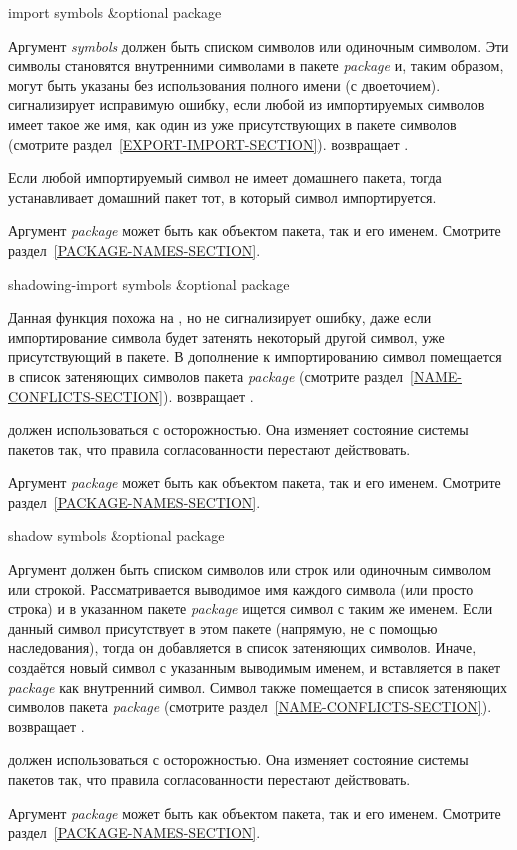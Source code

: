 \begin{defun}[Функция]
import symbols &optional package

Аргумент \emph{symbols} должен быть списком символов или одиночным символом.
Эти символы становятся внутренними символами в пакете \emph{package} и, таким
образом, могут быть указаны без использования полного имени (с двоеточием).
 сигнализирует исправимую ошибку, если любой из импортируемых
символов имеет такое же имя, как один из уже присутствующих в пакете символов
(смотрите раздел~\ref{EXPORT-IMPORT-SECTION}).
 возвращает {\true}.

Если любой импортируемый символ не имеет домашнего пакета, тогда 
устанавливает домашний пакет тот, в который символ импортируется. 

Аргумент \emph{package} может быть как объектом пакета, так и его
именем. Смотрите раздел~\ref{PACKAGE-NAMES-SECTION}.
\end{defun}

\begin{defun}[Функция]
shadowing-import symbols &optional package

Данная функция похожа на , но не сигнализирует ошибку, даже если
импортирование символа будет затенять некоторый другой символ, уже
присутствующий в пакете. В дополнение к импортированию символ помещается в
список затеняющих символов пакета \emph{package} (смотрите
раздел~\ref{NAME-CONFLICTS-SECTION}).
 возвращает {\true}.

 должен использоваться с осторожностью. Она изменяет
состояние системы пакетов так, что правила согласованности перестают действовать.

Аргумент \emph{package} может быть как объектом пакета, так и его
именем. Смотрите раздел~\ref{PACKAGE-NAMES-SECTION}.
\end{defun}

\begin{defun}[Функция]
shadow symbols &optional package

Аргумент должен быть списком символов или строк или одиночным символом или строкой.
Рассматривается выводимое имя каждого символа (или просто строка) и в указанном
пакете \emph{package} ищется символ с таким же именем. Если данный символ
присутствует в этом пакете (напрямую, не с помощью наследования), тогда он
добавляется в список затеняющих символов. Иначе, создаётся новый символ с
указанным выводимым именем, и вставляется в пакет \emph{package} как внутренний
символ. Символ также помещается в список затеняющих символов пакета
\emph{package} (смотрите раздел~\ref{NAME-CONFLICTS-SECTION}).
 возвращает {\true}.

 должен использоваться с осторожностью. Она изменяет
состояние системы пакетов так, что правила согласованности перестают действовать.

Аргумент \emph{package} может быть как объектом пакета, так и его
именем. Смотрите раздел~\ref{PACKAGE-NAMES-SECTION}.
\end{defun}

